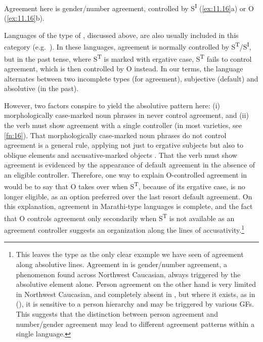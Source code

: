 \documentclass[output=paper]{langsci/langscibook}
\begin{document}
Agreement here is gender/number agreement, controlled by S\textsuperscript{I}
(\ref{ex:11.16}a) or O (\ref{ex:11.16}b).

Languages of the type of , discussed above, are also usually included in
this category (e.g.\ \citealt[305]{Bobaljik2008}). In these languages,
agreement is normally controlled by S\textsuperscript{T}/S\textsuperscript{I},
but in the past tense, where S\textsuperscript{T} is marked with ergative case,
S\textsuperscript{T} fails to control agreement, which is then controlled by O
instead. In our terms, the language alternates between two incomplete types
(for agreement), subjective (default) and absolutive (in the past).

However, two factors conspire to yield the absolutive pattern here: (i)
morphologically case-marked noun phrases in  never control agreement,
and (ii) the verb must show agreement with a single controller (in most
varieties, see \cref{fn:16}). That morphologically case-marked noun phrases do not
control agreement is a general rule, applying not just to ergative subjects but
also to oblique elements and accusative-marked objects
\citep[446]{Pandharipande1997}. That the verb must show agreement is evidenced
by the appearance of default agreement in the absence of an eligible
controller. Therefore, one way to explain O-controlled agreement in 
would be to say that O takes over when S\textsuperscript{T}, because of its
ergative case, is no longer eligible, as an option preferred over the last
resort default agreement. On this explanation, agreement in Marathi-type
languages is complete, and the fact that O controls agreement only secondarily
when S\textsuperscript{T} is not available as an agreement controller suggests
an organization along the lines of accusativity.\footnote{This leaves the
     type as the only clear example we have seen of agreement along
    absolutive lines. Agreement in  is gender/number agreement, a
    phenomenon found across Northwest Caucasian, always triggered by the
    absolutive element alone. Person agreement on the other hand is very
    limited in Northwest Caucasian, and completely absent in , but where it
    exists, as in  (\citealt{VandenBerg1995}), it is sensitive to a
    person hierarchy and may be triggered by various \glspl{GF}. This suggests that the distinction between person agreement and
    number/gender agreement may lead to different agreement  patterns
within a single language.\label{fn:21}}
\end{document}
